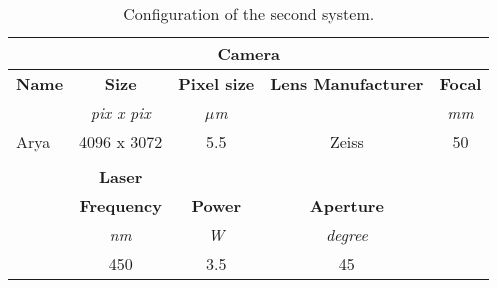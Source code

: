 \begin{table}[h!]
  \centering
  \begin{tabular}{ccccc}
  \hline
  \multicolumn{5}{|c|}{\textbf{Camera}}                                                                                                                                                                            \\ \hline
  \multicolumn{1}{|c|}{\textbf{Name}} & \multicolumn{1}{c|}{\textbf{Size}}      & \multicolumn{1}{c|}{\textbf{Pixel size}} & \multicolumn{1}{c|}{\textbf{Lens Manufacturer}} & \multicolumn{1}{c|}{\textbf{Focal}} \\ \hline
  \multicolumn{1}{|l|}{}              & \multicolumn{1}{c|}{\textit{pix x pix}} & \multicolumn{1}{c|}{\textit{$\mu$m}}        & \multicolumn{1}{c|}{}                           & \multicolumn{1}{c|}{\textit{mm}}    \\ \hline
  \multicolumn{1}{|l|}{Arya}          & \multicolumn{1}{c|}{4096 x 3072}        & \multicolumn{1}{c|}{5.5}                 & \multicolumn{1}{c|}{Zeiss}                      & \multicolumn{1}{c|}{50}             \\ \hline
  \multicolumn{1}{l}{}                & \multicolumn{1}{l}{}                    & \multicolumn{1}{l}{}                     & \multicolumn{1}{l}{}                            & \multicolumn{1}{l}{}                \\ \cline{2-4}
  \multicolumn{1}{c|}{}               & \multicolumn{1}{c|}{\textbf{Laser}}     & \multicolumn{1}{c|}{}                    & \multicolumn{1}{c|}{}                           &                                     \\ \cline{2-4}
  \multicolumn{1}{c|}{}               & \multicolumn{1}{c|}{\textbf{Frequency}} & \multicolumn{1}{c|}{\textbf{Power}}      & \multicolumn{1}{c|}{\textbf{Aperture}}          &                                     \\ \cline{2-4}
  \multicolumn{1}{c|}{\textit{}}      & \multicolumn{1}{c|}{\textit{nm}}        & \multicolumn{1}{c|}{\textit{W}}          & \multicolumn{1}{c|}{\textit{degree}}            & \textit{}                           \\ \cline{2-4}
  \multicolumn{1}{c|}{}               & \multicolumn{1}{c|}{450}                & \multicolumn{1}{c|}{3.5}                 & \multicolumn{1}{c|}{45}                         &                                     \\ \cline{2-4}
  \end{tabular}
  
  \caption{Configuration of the second system.}
  \label{tab:conf2}
\end{table}